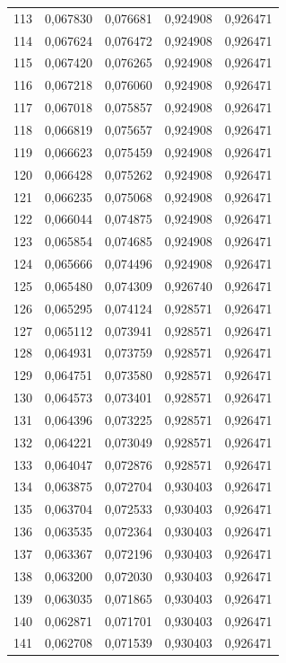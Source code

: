 \begin{tabular}{lrrrr}
113 & 0,067830 & 0,076681 & 0,924908 & 0,926471 \\
114 & 0,067624 & 0,076472 & 0,924908 & 0,926471 \\
115 & 0,067420 & 0,076265 & 0,924908 & 0,926471 \\
116 & 0,067218 & 0,076060 & 0,924908 & 0,926471 \\
117 & 0,067018 & 0,075857 & 0,924908 & 0,926471 \\
118 & 0,066819 & 0,075657 & 0,924908 & 0,926471 \\
119 & 0,066623 & 0,075459 & 0,924908 & 0,926471 \\
120 & 0,066428 & 0,075262 & 0,924908 & 0,926471 \\
121 & 0,066235 & 0,075068 & 0,924908 & 0,926471 \\
122 & 0,066044 & 0,074875 & 0,924908 & 0,926471 \\
123 & 0,065854 & 0,074685 & 0,924908 & 0,926471 \\
124 & 0,065666 & 0,074496 & 0,924908 & 0,926471 \\
125 & 0,065480 & 0,074309 & 0,926740 & 0,926471 \\
126 & 0,065295 & 0,074124 & 0,928571 & 0,926471 \\
127 & 0,065112 & 0,073941 & 0,928571 & 0,926471 \\
128 & 0,064931 & 0,073759 & 0,928571 & 0,926471 \\
129 & 0,064751 & 0,073580 & 0,928571 & 0,926471 \\
130 & 0,064573 & 0,073401 & 0,928571 & 0,926471 \\
131 & 0,064396 & 0,073225 & 0,928571 & 0,926471 \\
132 & 0,064221 & 0,073049 & 0,928571 & 0,926471 \\
133 & 0,064047 & 0,072876 & 0,928571 & 0,926471 \\
134 & 0,063875 & 0,072704 & 0,930403 & 0,926471 \\
135 & 0,063704 & 0,072533 & 0,930403 & 0,926471 \\
136 & 0,063535 & 0,072364 & 0,930403 & 0,926471 \\
137 & 0,063367 & 0,072196 & 0,930403 & 0,926471 \\
138 & 0,063200 & 0,072030 & 0,930403 & 0,926471 \\
139 & 0,063035 & 0,071865 & 0,930403 & 0,926471 \\
140 & 0,062871 & 0,071701 & 0,930403 & 0,926471 \\
141 & 0,062708 & 0,071539 & 0,930403 & 0,926471 \\

\end{tabular}
